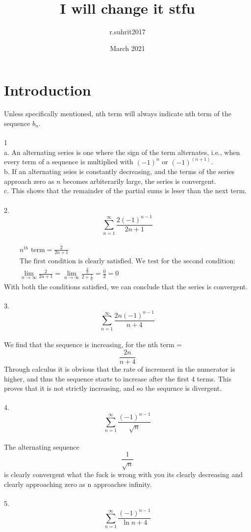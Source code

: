 \documentclass{article}
\title{I will change it stfu}
\author{r.suhrit2017}
\date{March 2021}
\begin{document}
\maketitle
\section{Introduction}
Unless specifically mentioned, nth term will always indicate nth term of the sequence $b_n$.
\\\\1
\\a. An alternating  series is one where the sign of the term alternates, i.e., when every term of a sequence is multiplied with $(-1)^{n}$ or $(-1)^{(n+1)}$.
\\b. If an alternating seies is constantly decreasing, and the terms of the series approach zero as $n$ becomes arbiterarily large, the series is convergent.
\\c. This shows that the remainder of the partial sums is leser than the next term.
\\\\2. $$\sum^{\infty}_{n=1}\frac{2(-1)^{n-1}}{2n+1}$$
\\\begin{gather*}
n^{th} \text{ term}=\frac{2}{2n+1}
\\\text{The first condition is clearly satisfied. We test for the second condition:}
\\\lim_{n\to\infty}\frac{2}{2n+1}=\lim_{n\to\infty}\frac{\frac{2}{n}}{2+\frac{1}{n}}=\frac{0}{2}=0
\end{gather*}
With both the conditions satisfied, we can conclude that the series is convergent.
\\\\3. $$\sum^{\infty}_{n=1}\frac{2n(-1)^{n-1}}{n+4}$$
\\We find that the sequence is increasing, for the nth term =$$\frac{2n}{n+4}$$ Through calculus it is obvious that the rate of increment in the numerator is higher, and thus the sequence starts to increase after the first 4 terms. This proves that it is not strictly increasing, and so the sequrnce is divergent.
\\\\4. $$\sum^{\infty}_{n=1}\frac{(-1)^{n-1}}{\sqrt{n}}$$
\\The alternating sequence $$\frac{1}{\sqrt{n}}$$ is clearly convergent what the fuck is wrong with you its clearly decreasing and clearly approaching zero as n approaches infinity.
\\\\5. $$\sum^{\infty}_{n=1}\frac{(-1)^{n-1}}{\ln{n}+4}$$
\end{document}
